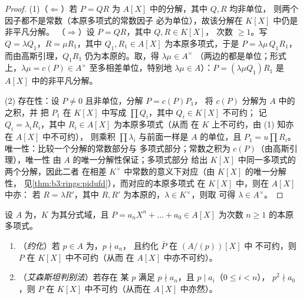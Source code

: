 \begin{proof}
(1)（$\Leftarrow$）若 $P = QR$ 为 $A[X]$ 中的分解，其中 $Q, R$ 均非单位，
则两个因子都不是常数（本原多项式的常数因子
必为单位），故该分解在 $K[X]$ 中仍是非平凡分解。
（$\Rightarrow$）设 $P = QR$，其中 $Q, R \in K[X]$，
次数 $\geq 1$。写 $Q = \lambda Q_1$，$R = \mu R_1$，其中 $Q_1, R_1
\in A[X]$ 为本原多项式，于是 $P = \lambda\mu\, Q_1R_1$，
而由高斯引理，$Q_1R_1$ 仍为本原的。取，得 $\lambda\mu \in A^\times$
（两边的都是单位；形式上，$\lambda\mu = c(P) \in
A^\times$ 至多相差单位，特别地 $\lambda \mu \in A$）：$P
= (\lambda\mu Q_1) R_1$ 是 $A[X]$ 中的非平凡分解。

(2) 存在性：设 $P \neq 0$ 且非单位，分解 $P = c(P)P_1$，
将 $c(P)$ 分解为 $A$ 中的之积，并
把 $P_1$ 在 $K[X]$ 中写成 $\prod Q_i$，其中 $Q_i \in K[X]$ 不可约；
记 $Q_i = \lambda_i R_i$，其中 $R_i \in A[X]$ 为本原多项式（从而
在 $K$ 上不可约，由 (1) 知亦在 $A[X]$ 中不可约），
则乘积 $\prod \lambda_i$ 与前面一样是 $A$ 的单位，且 $P_1 = u\prod
R_i$。唯一性：比较一个分解的常数部分与
多项式部分；常数之积为 $c(P)$（由高斯引理），唯一性
由 $A$ 的唯一分解性保证；多项式部分
给出 $K[X]$ 中同一多项式的两个分解，因此二者
在相差 $K^\times$ 中常数的意义下对应（由 $K[X]$ 的唯一分解性，
见\cref{thm:b3:rings:pidufd}），而对应的本原多项式
在 $K[X]$ 中，则在 $A[X]$ 中亦：
若 $R = \lambda R'$，其中 $R, R'$ 为本原的，$\lambda \in K^\times$，则取
可得 $\lambda \in A^\times$。
\end{proof}

\begin{theorem}[不可约性判别法]\label{thm:b3:rings:criteria}
设 $A$ 为，$K$ 为其分式域，且 $P = a_nX^n + \dots
+ a_0 \in A[X]$ 为次数 $n \geq 1$ 的本原多项式。
\begin{enumerate}
  \item （\emph{约化}）若 $p \in A$ 为，$p \nmid a_n$，
        且约化 $\bar P$ 在 $(A/(p))[X]$ 中
        不可约，则 $P$ 在 $K[X]$ 中不可约（从而
        在 $A[X]$ 中亦不可约）。
  \item （\emph{艾森斯坦判别法}）若存在
        某 $p$ 满足 $p \nmid a_n$，且 $p \mid a_i$（$0
        \leq i < n$），
        $p^2 \nmid a_0$，则 $P$ 在 $K[X]$ 中不可约（从而在 $A[X]$ 中亦然）。
\end{enumerate}
\end{theorem}

